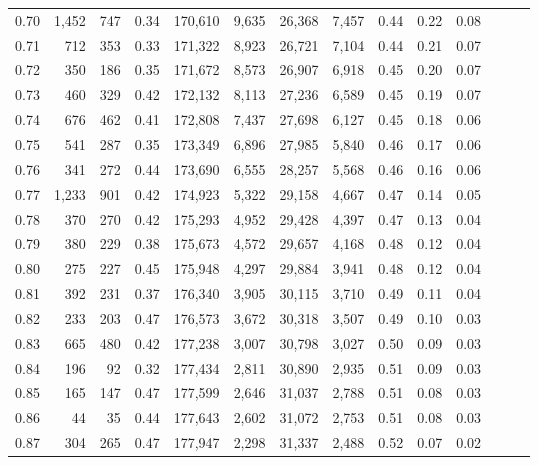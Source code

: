 \begin{tabular}{rrrrrrrrrrrrrr}
0.70 &   1,452 &    747 &  0.34 &  170,610 &    9,635 &  26,368 &   7,457 &  0.44 &  0.22 &      0.08 \\
0.71 &     712 &    353 &  0.33 &  171,322 &    8,923 &  26,721 &   7,104 &  0.44 &  0.21 &      0.07 \\
0.72 &     350 &    186 &  0.35 &  171,672 &    8,573 &  26,907 &   6,918 &  0.45 &  0.20 &      0.07 \\
0.73 &     460 &    329 &  0.42 &  172,132 &    8,113 &  27,236 &   6,589 &  0.45 &  0.19 &      0.07 \\
0.74 &     676 &    462 &  0.41 &  172,808 &    7,437 &  27,698 &   6,127 &  0.45 &  0.18 &      0.06 \\
0.75 &     541 &    287 &  0.35 &  173,349 &    6,896 &  27,985 &   5,840 &  0.46 &  0.17 &      0.06 \\
0.76 &     341 &    272 &  0.44 &  173,690 &    6,555 &  28,257 &   5,568 &  0.46 &  0.16 &      0.06 \\
0.77 &   1,233 &    901 &  0.42 &  174,923 &    5,322 &  29,158 &   4,667 &  0.47 &  0.14 &      0.05 \\
0.78 &     370 &    270 &  0.42 &  175,293 &    4,952 &  29,428 &   4,397 &  0.47 &  0.13 &      0.04 \\
0.79 &     380 &    229 &  0.38 &  175,673 &    4,572 &  29,657 &   4,168 &  0.48 &  0.12 &      0.04 \\
0.80 &     275 &    227 &  0.45 &  175,948 &    4,297 &  29,884 &   3,941 &  0.48 &  0.12 &      0.04 \\
0.81 &     392 &    231 &  0.37 &  176,340 &    3,905 &  30,115 &   3,710 &  0.49 &  0.11 &      0.04 \\
0.82 &     233 &    203 &  0.47 &  176,573 &    3,672 &  30,318 &   3,507 &  0.49 &  0.10 &      0.03 \\
0.83 &     665 &    480 &  0.42 &  177,238 &    3,007 &  30,798 &   3,027 &  0.50 &  0.09 &      0.03 \\
0.84 &     196 &     92 &  0.32 &  177,434 &    2,811 &  30,890 &   2,935 &  0.51 &  0.09 &      0.03 \\
0.85 &     165 &    147 &  0.47 &  177,599 &    2,646 &  31,037 &   2,788 &  0.51 &  0.08 &      0.03 \\
0.86 &      44 &     35 &  0.44 &  177,643 &    2,602 &  31,072 &   2,753 &  0.51 &  0.08 &      0.03 \\
0.87 &     304 &    265 &  0.47 &  177,947 &    2,298 &  31,337 &   2,488 &  0.52 &  0.07 &      0.02 \\

\end{tabular}
